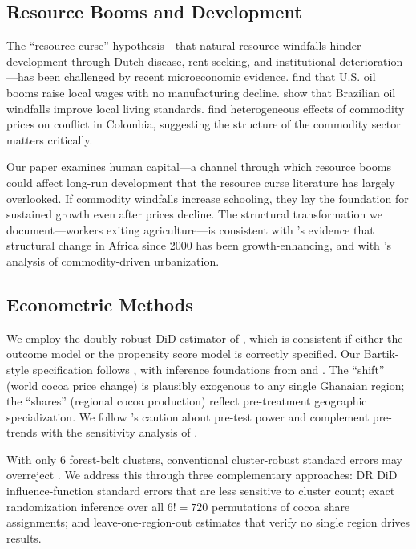 \documentclass[12pt]{article}
\begin{document}
\subsection{Resource Booms and Development}

The ``resource curse'' hypothesis---that natural resource windfalls hinder development through Dutch disease, rent-seeking, and institutional deterioration \citep{sachs2001, vanderploeg2011}---has been challenged by recent microeconomic evidence. \citet{allcott2018} find that U.S. oil booms raise local wages with no manufacturing decline. \citet{aragoncaselli2013} show that Brazilian oil windfalls improve local living standards. \citet{dube2013} find heterogeneous effects of commodity prices on conflict in Colombia, suggesting the structure of the commodity sector matters critically.

Our paper examines human capital---a channel through which resource booms could affect long-run development that the resource curse literature has largely overlooked. If commodity windfalls increase schooling, they lay the foundation for sustained growth even after prices decline. The structural transformation we document---workers exiting agriculture---is consistent with \citet{mcmillan2014}'s evidence that structural change in Africa since 2000 has been growth-enhancing, and with \citet{gollin2016}'s analysis of commodity-driven urbanization.

\subsection{Econometric Methods}

We employ the doubly-robust DiD estimator of \citet{santanna2020}, which is consistent if either the outcome model or the propensity score model is correctly specified. Our Bartik-style specification follows \citet{goldsmith2020}, with inference foundations from \citet{adao2019} and \citet{borusyak2022}. The ``shift'' (world cocoa price change) is plausibly exogenous to any single Ghanaian region; the ``shares'' (regional cocoa production) reflect pre-treatment geographic specialization. We follow \citet{roth2023}'s caution about pre-test power and complement pre-trends with the sensitivity analysis of \citet{cinelli2020}.

With only 6 forest-belt clusters, conventional cluster-robust standard errors may overreject \citep{cameron2008, mackinnon2017}. We address this through three complementary approaches: DR DiD influence-function standard errors that are less sensitive to cluster count; exact randomization inference over all $6! = 720$ permutations of cocoa share assignments; and leave-one-region-out estimates that verify no single region drives results.
\end{document}
